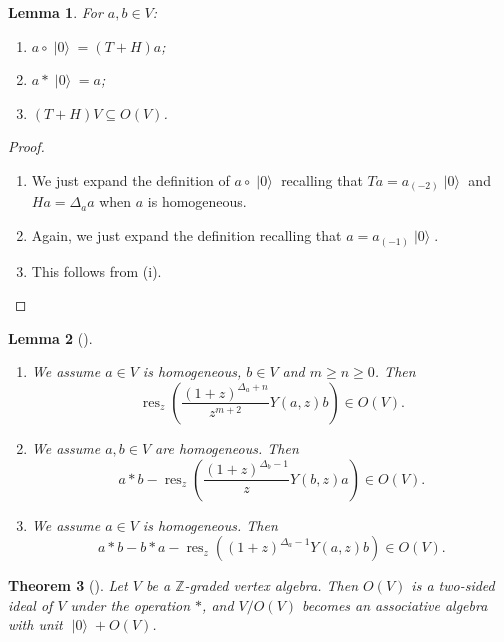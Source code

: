 \documentclass[a4paper, 12pt, reqno]{amsart}
\newtheorem{theorem}{Theorem}[section]
\newtheorem{lemma}[theorem]{Lemma}
\theoremstyle{remark}
\DeclareMathOperator{\res}{res}
\DeclareMathOperator{\vac}{|0\rangle}
\begin{document}
\begin{lemma}
  \label{lmm:20}
  For $a, b \in V$:
  \begin{enumerate}
  \item $a\circ\vac = (T + H)a$;
  \item $a*\vac = a$;
  \item $(T + H)V \subseteq O(V)$.
  \end{enumerate}
\end{lemma}

\begin{proof}\leavevmode
  \begin{enumerate}
  \item We just expand the definition of $a\circ\vac$ recalling that $Ta = a_{(-2)}\vac$ and $Ha = \Delta_aa$ when $a$ is homogeneous.
  \item Again, we just expand the definition recalling that $a = a_{(-1)}\vac$.
  \item This follows from (i). \qedhere
  \end{enumerate}
\end{proof}

\begin{lemma}[{\cite[Lemma 2.2]{dong_twisted_1998}}]\leavevmode
  \label{lmm:21}
  \begin{enumerate}
  \item We assume $a \in V$ is homogeneous, $b \in V$ and $m \ge n \ge 0$.
    Then
    \begin{equation*}
      \res_z\left(\frac{(1 + z)^{\Delta_a + n}}{z^{m + 2}}Y(a, z)b\right) \in O(V).
    \end{equation*}
  \item We assume $a, b \in V$ are homogeneous.
    Then
    \begin{equation*}
      a*b - \res_z\left(\frac{(1 + z)^{\Delta_b - 1}}{z}Y(b, z)a\right) \in O(V).
    \end{equation*}
  \item We assume $a \in V$ is homogeneous.
    Then
    \begin{equation*}
      a*b - b*a - \res_z((1 + z)^{\Delta_a - 1}Y(a, z)b) \in O(V).
    \end{equation*}
  \end{enumerate}
\end{lemma}

\begin{theorem}[{\cite[Proposition 2.3 and Theorem 2.4]{dong_twisted_1998}}]
  \label{thr:35}
  Let $V$ be a $\mathbb{Z}$-graded vertex algebra.
  Then $O(V)$ is a two-sided ideal of $V$ under the operation $*$, and $V/O(V)$ becomes an associative algebra with unit $\vac + O(V)$.
\end{theorem}
\end{document}
